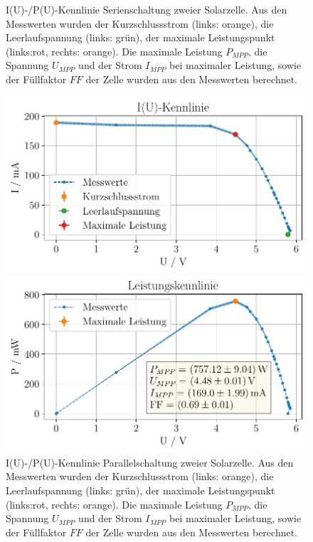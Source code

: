 \documentclass[english, ngerman]{scrartcl}
\begin{document}
\begin{figure}[H]
\begin{minipage}[t]{0.485\linewidth}
    \end{minipage}
    \caption[I(U)-/P(U)-Kennlinie Serienschaltung Solarzelle]{I(U)-/P(U)-Kennlinie Serienschaltung zweier Solarzelle. Aus den Messwerten wurden der Kurzschlussstrom (links: orange), die Leerlaufspannung (links: grün), der maximale Leistungspunkt (links:rot, rechts: orange). Die maximale Leistung $P_{MPP}$, die Spannung $U_{MPP}$ und der Strom $I_{MPP}$ bei maximaler Leistung, sowie der Füllfaktor $FF$ der Zelle wurden aus den Messwerten berechnet.}
    \label{fig:solar_seriell}
\end{figure}
\setcaphanging

\setcapindent{0pt}
\begin{figure}[H]
    \centering
    \begin{minipage}[t]{0.485\linewidth}
        \centering
        \includegraphics[width=\linewidth]{fig/plots/solar_parallel_UI_.pdf}
    \end{minipage}%
    \hspace*{\fill}
    \begin{minipage}[t]{0.485\linewidth}
        \centering
        \includegraphics[width=\linewidth]{fig/plots/solar_parallel_UP_.pdf}
    \end{minipage}
    \caption[I(U)-/P(U)-Kennlinie Parallelschaltung Solarzelle]{I(U)-/P(U)-Kennlinie Parallelschaltung zweier Solarzelle. Aus den Messwerten wurden der Kurzschlussstrom (links: orange), die Leerlaufspannung (links: grün), der maximale Leistungspunkt (links:rot, rechts: orange). Die maximale Leistung $P_{MPP}$, die Spannung $U_{MPP}$ und der Strom $I_{MPP}$ bei maximaler Leistung, sowie der Füllfaktor $FF$ der Zelle wurden aus den Messwerten berechnet.}
    \label{fig:solar_parallel}
\end{figure}
\end{document}
